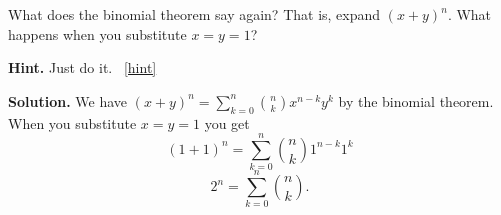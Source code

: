 \documentclass{book}
\begin{document}
\setcounter{project}{79}
\addtocounter{project}{-1}
\begin{activity}[]\label{act-pascalrowsum-binom}
\hypertarget{p-626}{}%
What does the binomial theorem say again?  That is, expand \((x+y)^n\).  What happens when you substitute \(x = y = 1\)?%
\par\smallskip%
\noindent\textbf{Hint.}\hypertarget{hint-36}{}\quad%
\hypertarget{p-627}{}%
Just do it.%
~\hfill{\tiny\hyperlink{a-79}{[hint]}\hypertarget{q-79}{}}\par\smallskip%
\noindent\textbf{Solution.}\hypertarget{solution-62}{}\quad%
\hypertarget{p-628}{}%
We have \((x+y)^n = \sum_{k=0}^n \binom{n}{k} x^{n-k}y^k\) by the binomial theorem.  When you substitute \(x = y = 1\) you get%
\begin{equation*}
(1+1)^n = \sum_{k=0}^n \binom{n}{k} 1^{n-k}1^k
\end{equation*}
%
\begin{equation*}
2^n = \sum_{k=0}^n \binom{n}{k}.
\end{equation*}
%
\end{activity}
\end{document}
